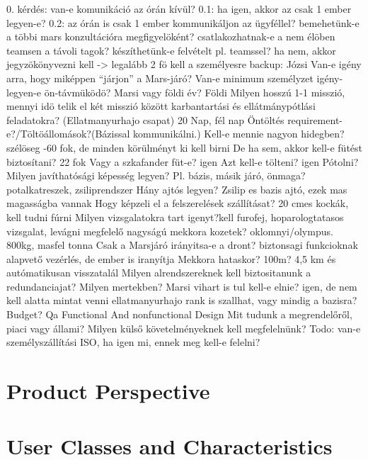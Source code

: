 \documentclass[12pt]{report}
\begin{document}
0. kérdés: van-e komunikáció az órán kívül?
0.1: ha igen, akkor az csak 1 ember legyen-e?
0.2: az órán is csak 1 ember kommunikáljon az ügyféllel? 
bemehetünk-e a többi mars konzultációra megfigyelöként?
csatlakozhatnak-e a nem élöben teamsen a távoli tagok?
készíthetünk-e felvételt pl. teamssel?
ha nem, akkor jegyzökönyvezni kell -> legalább 2 fö kell a személyesre
backup: Józsi
Van-e igény arra, hogy miképpen “járjon” a Mars-járó?
Van-e minimum személyzet igény- legyen-e ön-távmüködö?
Marsi vagy földi év? Földi
Milyen hosszú 1-1 misszió, mennyi idö telik el két misszió között karbantartási és ellátmánypótlási feladatokra? (Ellatmanyurhajo csapat) 20 Nap, fél nap
Öntöltés requirement-e?/Töltöállomások?(Bázissal kommunikálni.)
Kell-e mennie nagyon hidegben? szélöseg -60 fok, de minden körülményt ki kell birni
De ha sem, akkor kell-e fütést biztosítani? 22 fok
Vagy a szkafander füt-e? igen
Azt kell-e tölteni? igen
Pótolni?
Milyen javíthatósági képesség legyen? Pl. bázis, másik járó, önmaga? potalkatreszek, zsiliprendszer
Hány ajtós legyen? Zsilip es bazis ajtó, ezek mas magasságba vannak
Hogy képzeli el a felszerelések szállításat? 20 cmes kockák, kell tudni fúrni
Milyen vizsgalatokra tart igenyt?kell furofej, hoparologtatasos vizsgalat, levágni megfelelő nagyságú 
mekkora kozetek? oklomnyi/olympus. 800kg, masfel tonna
Csak a Marsjáró irányitsa-e a dront? biztonsagi funkcioknak alapvető vezérlés, de ember is iranyítja Mekkora hataskor? 100m? 4,5 km és autómatikusan visszatalál
Milyen alrendszereknek kell biztositanunk a redundanciajat? Milyen mertekben? Marsi vihart is tul kell-e elnie? igen, de nem kell alatta mintat venni
 ellatmanyurhajo rank is szallhat, vagy mindig a bazisra?
Budget? 
Qa
Functional
And nonfunctional
Design
Mit tudunk a megrendelőről, piaci vagy állami? 
Milyen külső követelményeknek kell megfelelnünk? Todo: van-e személyszállítási ISO, ha igen mi, ennek meg kell-e felelni? 
\section{Product Perspective}
\section{User Classes and Characteristics}
\end{document}
